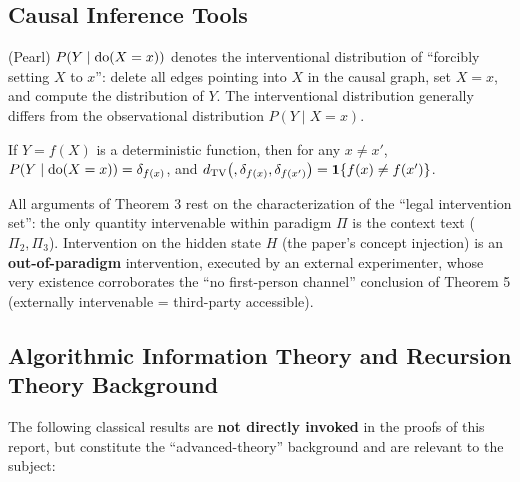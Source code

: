 \subsection{Causal Inference Tools}

\begin{definition}[Do-operator]\label{def:do}
(Pearl\cite{pearl-2009}) $P(Y \mid \operatorname{do}(X = x))$ denotes the interventional distribution of
``forcibly setting $X$ to $x$'': delete all edges pointing into $X$ in the causal graph, set
$X = x$, and compute the distribution of $Y$. The interventional distribution generally
differs from the observational distribution $P(Y \mid X = x)$.
\end{definition}

\begin{lemma}
If $Y = f(X)$ is a deterministic function, then for any $x \ne x'$,
$P(Y \mid \operatorname{do}(X = x)) = \delta_{f(x)}$, and
$d_{\mathrm{TV}}\!\left(,\delta_{f(x)}, \delta_{f(x')}\right) = \mathbf{1}\{f(x) \ne f(x')\}$.
\end{lemma}

\begin{remark}
All arguments of Theorem 3 rest on the characterization of the ``legal intervention set'':
the only quantity intervenable within paradigm $\Pi$ is the context text ($\Pi_2, \Pi_3$).
Intervention on the hidden state $H$ (the paper's concept injection) is an
\textbf{out-of-paradigm} intervention, executed by an external experimenter, whose very
existence corroborates the ``no first-person channel'' conclusion of Theorem 5 (externally
intervenable = third-party accessible).
\end{remark}

\subsection{Algorithmic Information Theory and Recursion Theory Background}

The following classical results are \textbf{not directly invoked} in the proofs of this
report, but constitute the ``advanced-theory'' background and are relevant to the subject:

